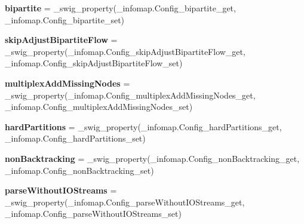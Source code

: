 \begin{DoxyCompactItemize}
\item 
\mbox{\label{classinfomapfolder_1_1infomap_1_1Config_ac1980614fb08b2766e3ef431ae693760}} 
{\bfseries bipartite} = \+\_\+swig\+\_\+property(\+\_\+infomap.\+Config\+\_\+bipartite\+\_\+get, \+\_\+infomap.\+Config\+\_\+bipartite\+\_\+set)
\item 
\mbox{\label{classinfomapfolder_1_1infomap_1_1Config_a013bce746f7efe3e8f2e9f28897732fa}} 
{\bfseries skip\+Adjust\+Bipartite\+Flow} = \+\_\+swig\+\_\+property(\+\_\+infomap.\+Config\+\_\+skip\+Adjust\+Bipartite\+Flow\+\_\+get, \+\_\+infomap.\+Config\+\_\+skip\+Adjust\+Bipartite\+Flow\+\_\+set)
\item 
\mbox{\label{classinfomapfolder_1_1infomap_1_1Config_a78e58d8b80b0476ee366b29db466dda3}} 
{\bfseries multiplex\+Add\+Missing\+Nodes} = \+\_\+swig\+\_\+property(\+\_\+infomap.\+Config\+\_\+multiplex\+Add\+Missing\+Nodes\+\_\+get, \+\_\+infomap.\+Config\+\_\+multiplex\+Add\+Missing\+Nodes\+\_\+set)
\item 
\mbox{\label{classinfomapfolder_1_1infomap_1_1Config_ae8e4e308a4ea7a5aa8e96e1773a35e05}} 
{\bfseries hard\+Partitions} = \+\_\+swig\+\_\+property(\+\_\+infomap.\+Config\+\_\+hard\+Partitions\+\_\+get, \+\_\+infomap.\+Config\+\_\+hard\+Partitions\+\_\+set)
\item 
\mbox{\label{classinfomapfolder_1_1infomap_1_1Config_ab7750c9c9bd899589e15557238f8abe9}} 
{\bfseries non\+Backtracking} = \+\_\+swig\+\_\+property(\+\_\+infomap.\+Config\+\_\+non\+Backtracking\+\_\+get, \+\_\+infomap.\+Config\+\_\+non\+Backtracking\+\_\+set)
\item 
\mbox{\label{classinfomapfolder_1_1infomap_1_1Config_a55221efcfb99ea0d2e569018a788ee98}} 
{\bfseries parse\+Without\+I\+O\+Streams} = \+\_\+swig\+\_\+property(\+\_\+infomap.\+Config\+\_\+parse\+Without\+I\+O\+Streams\+\_\+get, \+\_\+infomap.\+Config\+\_\+parse\+Without\+I\+O\+Streams\+\_\+set)
\item 
\mbox{\label{classinfomapfolder_1_1infomap_1_1Config_a6ecb7b41f8db20975c45264f7a584c99}} 

\end{DoxyCompactItemize}
